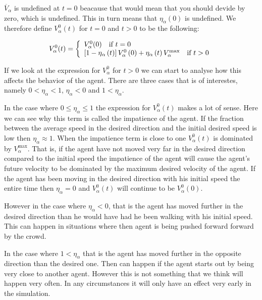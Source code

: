 $\overline{V}_{\alpha}$ is undefined at $t=0$ beacause that would mean 
that you should devide by zero, which is undefined. This in turn means 
that $\eta_{\alpha}(0)$ is undefined. We therefore define 
$V_{\alpha}^{0}(t)$ for $t=0$ and $t>0$ to be the following:

\[
  V_{\alpha}^{0} (t) = \left\{ 
  \begin{array}{l l}
    V_{\alpha}^{0}(0) \quad \text{if $t=0$}\\
    \left[ 1 - \eta_{\alpha} \left( t \right) \right] 
    V_{\alpha}^{0} \left( 0 \right) +
    \eta_{\alpha} \left( t \right)V_{\alpha}^{\text{max}} \quad \text{if $t>0$}\\
  \end{array} \right.
\]

If we look at the expression for $V_{\alpha}^{0}$ for $t>0$ we can 
start to analyse how this affects the behavior of the agent. There 
are three cases that is of interestes, namely $0 < \eta_{\alpha} < 1$, 
$\eta_{\alpha} < 0$ and $1 < \eta_{\alpha} $.

In the case where $0 \leq \eta_{\alpha} \leq 1$ the expression for 
$V_{\alpha}^{0} \left( t \right)$ makes a lot of sense. Here we can see why this term 
is called the impatience of the agent. If the fraction  between the average 
speed in the desired direction and the initial desired speed is low then 
$\eta_{\alpha} \approx 1$. 
When the impatience term is close to one $V_{\alpha}^{0} \left( t \right)$ is 
dominated by $V_{\alpha}^{\text{max}}$. That is, if the agent have not moved 
very far in the desired direction compared to the initial speed the impatience 
of the agent will cause the agent's future velocity to be dominated by the 
maximum desired velocity of the agent. 
If the agent has been moving in the desired direction with his initial speed 
the entire time then $\eta_{\alpha} = 0$  and $V_{\alpha}^{0} \left( t 
\right)$ will continue to be $V_{\alpha}^{0} \left( 0 \right)$. 

However in the case where $\eta_{\alpha} < 0$, that is the agent has moved 
further in the desired direction than he would have had he been walking with his 
initial speed. This can happen in situations where then agent is being pushed 
forward forward by the crowd.

In the case where $1 < \eta_{\alpha}$ that is the agent has moved further 
in the opposite direction than the desired one. Then can happen if the agent 
starts out by being very close to another agent. However this is not something 
that we think will happen very often. In any circumstances it will only have an 
effect very early in the simulation. 

